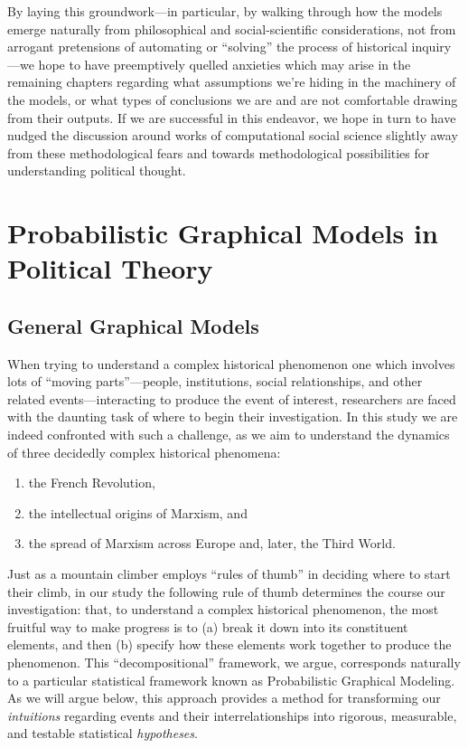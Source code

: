 \documentclass[11pt]{article}
\begin{document}
By laying this groundwork---in particular, by walking through how the models emerge naturally
from philosophical and social-scientific considerations, not from arrogant pretensions of automating or ``solving'' the process of historical inquiry---we hope to have preemptively quelled anxieties which may arise in the remaining chapters regarding what assumptions we're hiding in the machinery of the models, or what types of conclusions we are and are not comfortable drawing from their outputs. If we are successful in this endeavor, we hope in turn to have nudged the discussion around works of computational social science slightly away from these methodological fears and towards methodological possibilities for understanding political thought.

\appendix

\section{Probabilistic Graphical Models in Political Theory}\label{sec:pgms}

\subsection{General Graphical Models}\label{sec:gms}

When trying to understand a complex historical phenomenon
one which involves lots of ``moving parts''---people, institutions, social relationships, and other related events---interacting to produce the event of interest, researchers are faced with the daunting task of where to begin their investigation. In this study we are indeed confronted with such a challenge, as we aim to understand the dynamics of three decidedly complex historical phenomena:
\begin{enumerate}
	\item the French Revolution,
	\item the intellectual origins of Marxism, and
	\item the spread of Marxism across Europe and, later, the Third World.
\end{enumerate}
Just as a mountain climber employs ``rules of thumb'' in deciding where to start their climb, in our study the following rule of thumb determines the course our investigation: that, to understand a complex historical phenomenon, the most fruitful way to make progress is to (a) break it down into its constituent elements, and then (b) specify how these elements work together to produce the phenomenon. This ``decompositional'' framework, we argue, corresponds naturally to a particular statistical framework known as Probabilistic Graphical Modeling. As we will argue below, this approach provides a method for transforming our \textit{intuitions} regarding events and their interrelationships into rigorous, measurable, and testable statistical \textit{hypotheses}.
\end{document}
